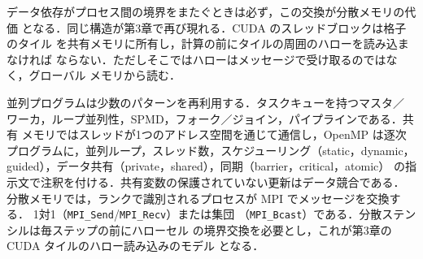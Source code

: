 \documentclass[../main.tex]{subfiles}
\begin{document}
データ依存がプロセス間の境界をまたぐときは必ず，この交換が分散メモリの代価
となる．同じ構造が第3章で再び現れる．CUDA のスレッドブロックは格子のタイル
を共有メモリに所有し，計算の前にタイルの周囲のハローを読み込まなければ
ならない．ただしそこではハローはメッセージで受け取るのではなく，グローバル
メモリから読む．

\begin{keypoint}[章のまとめ]
  並列プログラムは少数のパターンを再利用する．タスクキューを持つマスタ／
  ワーカ，ループ並列性，SPMD，フォーク／ジョイン，パイプラインである．共有
  メモリではスレッドが1つのアドレス空間を通じて通信し，OpenMP は逐次
  プログラムに，並列ループ，スレッド数，スケジューリング（static，dynamic，
  guided），データ共有（private，shared），同期（barrier，critical，atomic）
  の指示文で注釈を付ける．共有変数の保護されていない更新はデータ競合である．
  分散メモリでは，ランクで識別されるプロセスが MPI でメッセージを交換する．
  1対1（\texttt{MPI\_Send}/\texttt{MPI\_Recv}）または集団
  （\texttt{MPI\_Bcast}）である．分散ステンシルは毎ステップの前にハローセル
  の境界交換を必要とし，これが第3章の CUDA タイルのハロー読み込みのモデル
  となる．
\end{keypoint}
\end{document}
